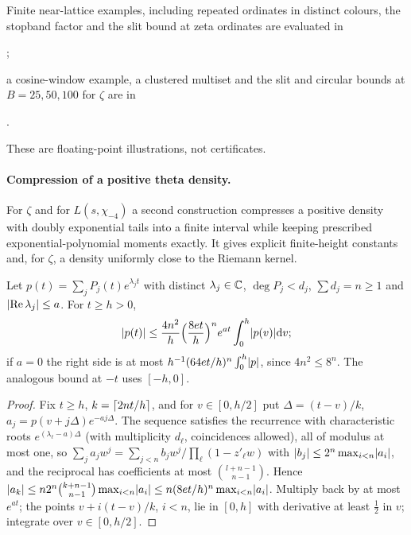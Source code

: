 Finite near-lattice examples, including repeated ordinates in distinct colours, the stopband factor and the
slit bound at zeta ordinates are evaluated in
\begin{center};\end{center}
a cosine-window example, a clustered multiset and the slit and circular bounds at $B=25,50,100$ for $\zeta$ are in
\begin{center}.\end{center}
These are floating-point illustrations, not certificates.

\paragraph{Compression of a positive theta density.}
For $\zeta$ and for $L(s,\chi_{-4})$ a second construction compresses a positive density with doubly
exponential tails into a finite interval while keeping prescribed exponential-polynomial moments exactly. It
gives explicit finite-height constants and, for $\zeta$, a density uniformly close to the Riemann kernel.

\begin{lemma}\label{fil:lem:extrap}
Let $p(t)=\sum_{j}P_j(t)e^{\lambda_jt}$ with distinct $\lambda_j\in\mathbb{C}$, $\deg P_j<d_j$, $\sum d_j=n\ge1$ and
$\lvert\operatorname{Re}\lambda_j\rvert\le a$. For $t\ge h>0$,
\[
 \lvert p(t)\rvert\le\frac{4n^2}h\Bigl(\frac{8et}h\Bigr)^ne^{at}\int_0^h\lvert p(v)\rvert\mathrm{d} v ;
\]
if $a=0$ the right side is at most $h^{-1}(64et/h)^n\int_0^h\lvert p\rvert$, since $4n^2\le8^n$. The analogous bound at
$-t$ uses $[-h,0]$.
\end{lemma}

\begin{proof}
Fix $t\ge h$, $k=\lceil2nt/h\rceil$, and for $v\in[0,h/2]$ put $\Delta=(t-v)/k$, $a_j=p(v+j\Delta)e^{-aj\Delta}$. The
sequence satisfies the recurrence with characteristic roots $e^{(\lambda_\ell-a)\Delta}$ (with multiplicity
$d_\ell$, coincidences allowed), all of modulus at most one, so $\sum_ja_jw^j=\sum_{j<n}b_jw^j/\prod_\ell(1-z'_\ell w)$
with $\lvert b_j\rvert\le2^n\max_{i<n}\lvert a_i\rvert$, and the reciprocal has coefficients at most $\binom{l+n-1}{n-1}$.
Hence $\lvert a_k\rvert\le n2^n\binom{k+n-1}{n-1}\max_{i<n}\lvert a_i\rvert\le n(8et/h)^n\max_{i<n}\lvert a_i\rvert$. Multiply back by at
most $e^{at}$; the points $v+i(t-v)/k$, $i<n$, lie in $[0,h]$ with derivative at least $\tfrac12$ in $v$;
integrate over $v\in[0,h/2]$.
\end{proof}

